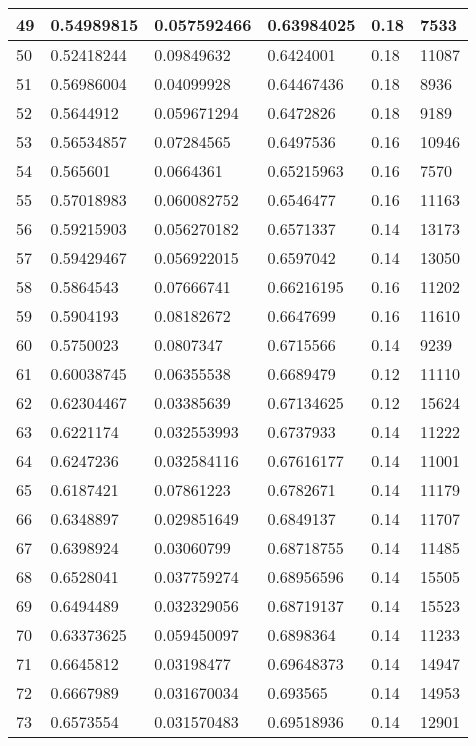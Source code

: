 \begin{longtable}{|l|l|l|l|l|l|}
49 & 0.54989815 & 0.057592466 & 0.63984025 & 0.18 & 7533 \\ \hline 
50 & 0.52418244 & 0.09849632 & 0.6424001 & 0.18 & 11087 \\ \hline 
51 & 0.56986004 & 0.04099928 & 0.64467436 & 0.18 & 8936 \\ \hline 
52 & 0.5644912 & 0.059671294 & 0.6472826 & 0.18 & 9189 \\ \hline 
53 & 0.56534857 & 0.07284565 & 0.6497536 & 0.16 & 10946 \\ \hline 
54 & 0.565601 & 0.0664361 & 0.65215963 & 0.16 & 7570 \\ \hline 
55 & 0.57018983 & 0.060082752 & 0.6546477 & 0.16 & 11163 \\ \hline 
56 & 0.59215903 & 0.056270182 & 0.6571337 & 0.14 & 13173 \\ \hline 
57 & 0.59429467 & 0.056922015 & 0.6597042 & 0.14 & 13050 \\ \hline 
58 & 0.5864543 & 0.07666741 & 0.66216195 & 0.16 & 11202 \\ \hline 
59 & 0.5904193 & 0.08182672 & 0.6647699 & 0.16 & 11610 \\ \hline 
60 & 0.5750023 & 0.0807347 & 0.6715566 & 0.14 & 9239 \\ \hline 
61 & 0.60038745 & 0.06355538 & 0.6689479 & 0.12 & 11110 \\ \hline 
62 & 0.62304467 & 0.03385639 & 0.67134625 & 0.12 & 15624 \\ \hline 
63 & 0.6221174 & 0.032553993 & 0.6737933 & 0.14 & 11222 \\ \hline 
64 & 0.6247236 & 0.032584116 & 0.67616177 & 0.14 & 11001 \\ \hline 
65 & 0.6187421 & 0.07861223 & 0.6782671 & 0.14 & 11179 \\ \hline 
66 & 0.6348897 & 0.029851649 & 0.6849137 & 0.14 & 11707 \\ \hline 
67 & 0.6398924 & 0.03060799 & 0.68718755 & 0.14 & 11485 \\ \hline 
68 & 0.6528041 & 0.037759274 & 0.68956596 & 0.14 & 15505 \\ \hline 
69 & 0.6494489 & 0.032329056 & 0.68719137 & 0.14 & 15523 \\ \hline 
70 & 0.63373625 & 0.059450097 & 0.6898364 & 0.14 & 11233 \\ \hline 
71 & 0.6645812 & 0.03198477 & 0.69648373 & 0.14 & 14947 \\ \hline 
72 & 0.6667989 & 0.031670034 & 0.693565 & 0.14 & 14953 \\ \hline 
73 & 0.6573554 & 0.031570483 & 0.69518936 & 0.14 & 12901 \\ \hline 

\end{longtable}
